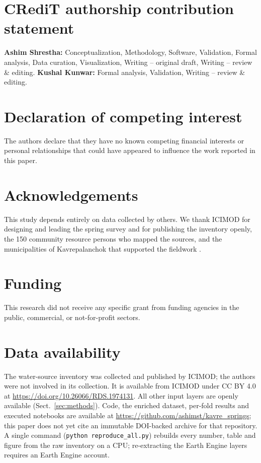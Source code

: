 \documentclass[preprint,12pt,authoryear]{elsarticle}
\begin{document}
\section*{CRediT authorship contribution statement}
\textbf{Ashim Shrestha:} Conceptualization, Methodology, Software, Validation, Formal analysis, Data curation, Visualization, Writing -- original draft, Writing -- review \& editing.
\textbf{Kushal Kunwar:} Formal analysis, Validation, Writing -- review \& editing.

\section*{Declaration of competing interest}
The authors declare that they have no known competing financial interests or personal relationships that could have appeared to influence the work reported in this paper.

\section*{Acknowledgements}
This study depends entirely on data collected by others. We thank ICIMOD for designing and leading the spring survey and for publishing the inventory openly, the 150 community resource persons who mapped the sources, and the municipalities of Kavrepalanchok that supported the fieldwork \citep{thapa2025citizen, icimod2025kavredata}.

\section*{Funding}
This research did not receive any specific grant from funding agencies in the public, commercial, or not-for-profit sectors.

\section*{Data availability}
The water-source inventory was collected and published by ICIMOD; the authors were not involved in its collection. It is available from ICIMOD under CC BY 4.0 \citep{icimod2025kavredata} at \url{https://doi.org/10.26066/RDS.1974131}. All other input layers are openly available (Sect.~\ref{sec:methods}). Code, the enriched dataset, per-fold results and executed notebooks are available at \url{https://github.com/ashimst/kavre_springs}; this paper does not yet cite an immutable DOI-backed archive for that repository. A single command (\texttt{python reproduce\_all.py}) rebuilds every number, table and figure from the raw inventory on a CPU; re-extracting the Earth Engine layers requires an Earth Engine account.
\end{document}
